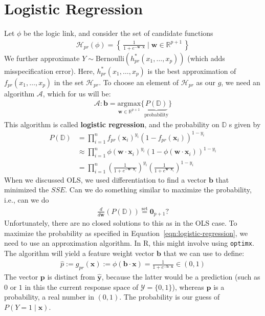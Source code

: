 \documentclass[12pt, a4paper]{article}
\theoremstyle{definition}
\begin{document}
	\section*{Logistic Regression}
	Let $\phi$ be the logic link, and consider the set of candidate functions
	\begin{align*}
		\mathcal{H}_{pr}(\phi) = \left\{\,
		\frac{1}{1 + e^{-\bm{w}\cdot\bm{x}}} \mid \bm{w}\in \mathbb{R}^{p+1}
		\,\right\}
	\end{align*}
	We further approximate $Y\sim \text{Bernoulli}(h^*_{pr}(x_1,\ldots,x_p))$ (which adds
	misspecification error). Here, $h^*_{pr}(x_1,\ldots,x_p)$ is the best approximation
	of $f_{pr}(x_1,\ldots,x_p)$ in the set $\mathcal{H}_{pr}$. To choose an element
	of $\mathcal{H}_{pr}$ as our $g$, we need an algorithm $\mathcal{A}$, which
	for us will be:
	\begin{align}
		\mathcal{A}:\bm{b}
		= \underset{\bm{w}\in \mathbb{R}^{p+1}}{\text{argmax}}\{\underbrace{P(\mathbb{D})}_{\text{probability}}\}
		\label{eqn:logistic-regression}
	\end{align}
	This algorithm is called \textbf{logistic regression}, and the probability
	on $\mathbb{D}$ s given by
	\begin{align*}
		P(\mathbb{D}) 
		&= \prod_{i=1}^{n}f_{pr}(\bm{x}_i)^{y_i}(1 - f_{pr}(\bm{x}_i))^{1-y_i}\\
		&\approx \prod_{i=1}^{n}\phi(\bm{w}\cdot \bm{x}_i)^{y_i}(1 - \phi(\bm{w}\cdot \bm{x}_i))^{1-y_i}\\
		&= \prod_{i=1}^{n}\left(\frac{1}{1 + e^{-\bm{w}\cdot \bm{x}_i}}\right)^{y_i}
		\left(\frac{1}{1 + e^{\bm{w}\cdot \bm{x}_i}}\right)^{1-y_i}
	\end{align*}
	When we discussed OLS, we used differentiation to find a vector $\bm{b}$
	that minimized the $SSE$. Can we do something similar to maximize the probability,
	i.e., can we do
	\begin{align*}
		\frac{d}{d\bm{w}}\left(P(\mathbb{D})\right)\stackrel{\text{set}}{=}\bm{0}_{p+1}?
	\end{align*}
	Unfortunately, there are no closed solutions to this as in the OLS case.
	To maximize the probability as specified in Equation~\ref{eqn:logistic-regression},
	we need to use an approximation algorithm. In R, this might involve using
	\texttt{optimx}. The algorithm will yield a feature weight vector $\bm{b}$
	that we can use to define:
	\begin{align*}
		\hat{p} := g_{pr}(\bm{x}) := \phi(\bm{b}\cdot \bm{x}) = \frac{1}{1 + e^{-\bm{b}\cdot \bm{x}}}
		\in (0,1)
	\end{align*}
	The vector $\bm{p}$ is distinct from $\hat{\bm{y}}$, because the latter would be
	a prediction (such as $0$ or $1$ in this the current response space of $\mathcal{Y}=\{0,1\}$),
	whereas $\bm{p}$ is a probability, a real number in $(0,1)$. The probability
	is our guess of $P(Y=1\mid \bm{x})$.
	
\end{document}
